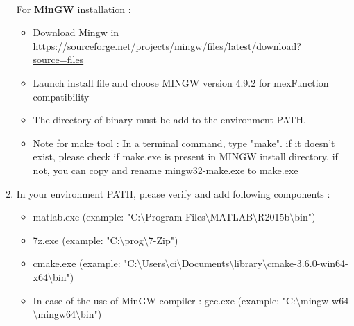 \begin{enumerate}
\paragraph{}For \textbf{MinGW} installation :
\begin{itemize}
\item Download Mingw in \url{https://sourceforge.net/projects/mingw/files/latest/download?source=files}
\item Launch install file and choose MINGW version 4.9.2 for mexFunction compatibility 
\item The directory of binary must be add to the environment PATH. 

\item Note for make tool : In a terminal command, type "make". if it doesn't exist, please check if make.exe is present in MINGW install directory. if not, you can copy and rename mingw32-make.exe to make.exe
\end{itemize}



\item In your environment PATH, please verify and add following components :

\begin{itemize}
\item matlab.exe (example: "C:$\setminus$Program Files$\setminus$MATLAB$\setminus$R2015b$\setminus$bin")
\item 7z.exe (example: "C:$\setminus$prog$\setminus$7-Zip")
\item cmake.exe (example: "C:$\setminus$Users$\setminus$ci$\setminus$Documents$\setminus$library$\setminus$cmake-3.6.0-win64-x64$\setminus$bin")
\item In case of the use of MinGW compiler : gcc.exe (example: "C:$\setminus$mingw-w64$\setminus$mingw64$\setminus$bin")
\end{itemize}
\end{enumerate}


